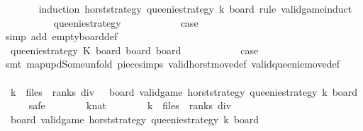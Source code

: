 \begin{isabellebody}
\ \ \ \ \ \ \isamarkupfalse%
\ {\isacharparenleft}induction\ {\isacharquery}horst{\isacharunderscore}strategy\ queenie{\isacharunderscore}strategy\ k\ board\ rule{\isacharcolon}\ valid{\isacharunderscore}game{\isachardot}induct{\isacharparenright}\isanewline
\ \ \ \ \ \ \ \ \isamarkupfalse%
\ {\isacharparenleft}{}\ queenie{\isacharunderscore}strategy{\isacharparenright}\isanewline
\ \ \ \ \ \ \ \ \isamarkupfalse%
\ \isamarkupfalse%
\ {\isacharquery}case\isanewline
\ \ \ \ \ \ \ \ \ \ \isamarkupfalse%
\ {\isacharparenleft}simp\ add{\isacharcolon}\ empty{\isacharunderscore}board{\isacharunderscore}def{\isacharparenright}\isanewline
\ \ \ \ \ \ \isamarkupfalse%
\isanewline
\ \ \ \ \ \ \ \ \isamarkupfalse%
\ {\isacharparenleft}{}\ queenie{\isacharunderscore}strategy\ K\ board\ board{\isacharprime}\ board{\isacharprime}{\isacharprime}{\isacharparenright}\isanewline
\ \ \ \ \ \ \ \ \isamarkupfalse%
\ \isamarkupfalse%
\ {\isacharquery}case\isanewline
\ \ \ \ \ \ \ \ \ \ \isamarkupfalse%
\ {\isacharparenleft}smt\ map{\isacharunderscore}upd{\isacharunderscore}Some{\isacharunderscore}unfold\ piece{\isachardot}simps{\isacharparenleft}{}{\isacharparenright}\ valid{\isacharunderscore}horst{\isacharunderscore}move{\isacharprime}{\isacharunderscore}def\ valid{\isacharunderscore}queenie{\isacharunderscore}move{\isacharunderscore}def{\isacharparenright}\isanewline
\ \ \ \ \ \ \isamarkupfalse%
\isanewline
\ \ \ \ \isamarkupfalse%
\isanewline
\isanewline
\ \ \ \ \isamarkupfalse%
\ {\isachardoublequoteopen}{\isasymforall}\ k\ {\isasymle}\ {\isacharparenleft}files\ {\isacharasterisk}\ ranks{\isacharparenright}\ div\ {}{\isachardot}\ {\isasymexists}\ board{\isachardot}\ valid{\isacharunderscore}game\ {\isacharquery}horst{\isacharunderscore}strategy\ queenie{\isacharunderscore}strategy\ k\ board{\isachardoublequoteclose}\isanewline
\ \ \ \ \isamarkupfalse%
\ safe\isanewline
\ \ \ \ \ \ \isamarkupfalse%
\ k{\isacharcolon}{\isacharcolon}nat\isanewline
\ \ \ \ \ \ \isamarkupfalse%
\ {\isachardoublequoteopen}k\ {\isasymle}\ {\isacharparenleft}files\ {\isacharasterisk}\ ranks{\isacharparenright}\ div\ {}{\isachardoublequoteclose}\isanewline
\ \ \ \ \ \ \isamarkupfalse%
\ \isamarkupfalse%
\ {\isachardoublequoteopen}{\isasymexists}\ board{\isachardot}\ valid{\isacharunderscore}game\ {\isacharquery}horst{\isacharunderscore}strategy\ queenie{\isacharunderscore}strategy\ k\ board{\isachardoublequoteclose}\isanewline

\end{isabellebody}
